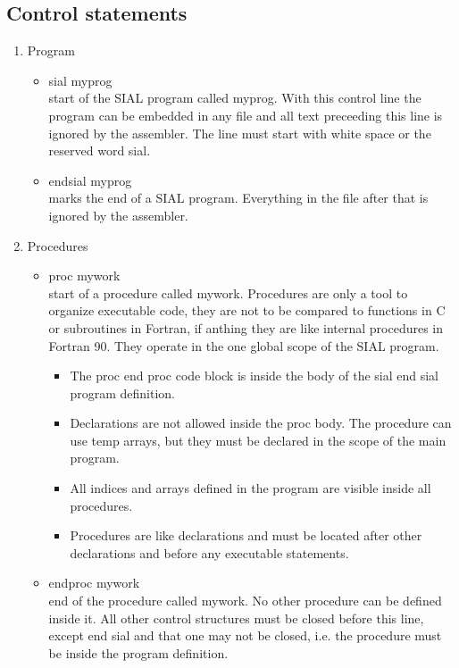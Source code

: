 \documentclass[12pt]{article}
\begin{document}
\subsection{Control statements}

\begin{enumerate} 
\item Program 

\begin{itemize} 

  \item sial myprog\\ 
start of the SIAL program called myprog. With this control line the program can be embedded 
in any file and all text preceeding this line is ignored by the assembler. The line must start 
with white space or the reserved word sial. 

  \item endsial myprog\\ 
marks the end of a SIAL program. Everything in the file after that is ignored by the assembler.

\end{itemize} 

\item Procedures 

\begin{itemize} 

 \item  proc mywork\\ 
start of a procedure called mywork. Procedures are only a tool to organize executable 
code, they are not to be compared to functions in C or subroutines in Fortran, if anthing 
they are like internal procedures in Fortran 90. They operate in the one global scope of 
the SIAL program. 
 \begin{itemize} 
   \item The proc end proc code block is inside the body of the sial end sial program definition.
   \item Declarations are not allowed inside the proc body. The procedure can use temp 
         arrays, but they must be declared in the scope of the main program.
   \item All indices and arrays defined in the program are visible inside all procedures.
   \item Procedures are like declarations and must be located after other declarations and 
         before any executable statements.
 \end{itemize} 

  \item endproc mywork\\ 
end of the procedure called mywork. No other procedure can be defined inside it. All other 
control structures must be closed before this line, except end sial and that one may not 
be closed, i.e. the procedure must be inside the program definition. 


\end{itemize}
\end{enumerate}
\end{document}
